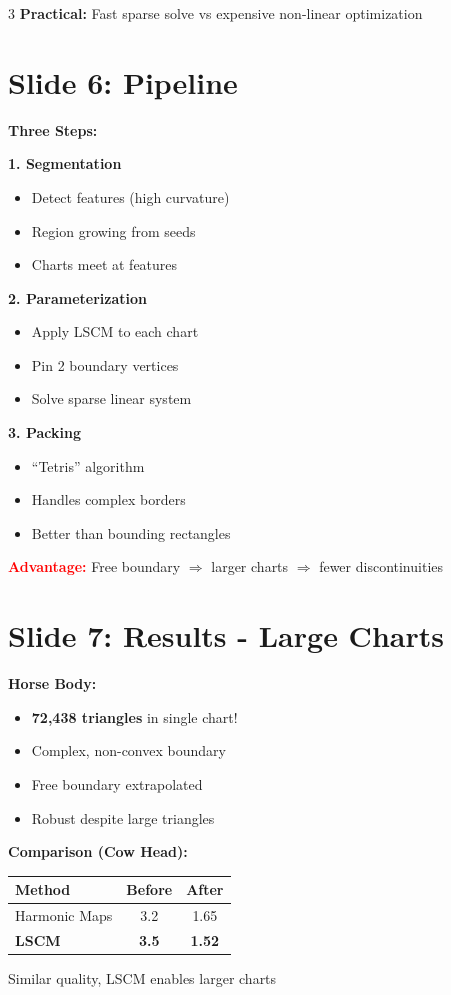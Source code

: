 \documentclass[10pt,landscape]{article}
\newcommand{\slide}[1]{\section*{Slide #1}}
\begin{document}
\begin{multicols}{3}
\textbf{Practical:} Fast sparse solve vs expensive non-linear optimization

\slide{6: Pipeline}
\textbf{Three Steps:}

\textbf{1. Segmentation}
\begin{itemize}
\item Detect features (high curvature)
\item Region growing from seeds
\item Charts meet at features
\end{itemize}

\textbf{2. Parameterization}
\begin{itemize}
\item Apply LSCM to each chart
\item Pin 2 boundary vertices
\item Solve sparse linear system
\end{itemize}

\textbf{3. Packing}
\begin{itemize}
\item ``Tetris'' algorithm
\item Handles complex borders
\item Better than bounding rectangles
\end{itemize}

\textcolor{red}{\textbf{Advantage:}} Free boundary $\Rightarrow$ larger charts $\Rightarrow$ fewer discontinuities

\columnbreak

\slide{7: Results - Large Charts}
\textbf{Horse Body:}
\begin{itemize}
\item \textbf{72,438 triangles} in single chart!
\item Complex, non-convex boundary
\item Free boundary extrapolated
\item Robust despite large triangles
\end{itemize}

\textbf{Comparison (Cow Head):}

\begin{tabular}{lcc}
\toprule
Method & Before & After \\
\midrule
Harmonic Maps & 3.2 & 1.65 \\
\textbf{LSCM} & \textbf{3.5} & \textbf{1.52} \\
\bottomrule
\end{tabular}

Similar quality, LSCM enables larger charts


\end{multicols}
\end{document}
